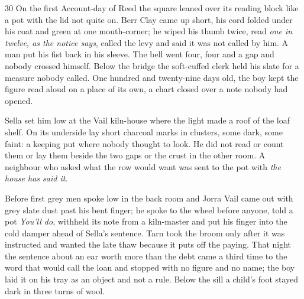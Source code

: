 
\scenebreak

\scenebreak


\scenebreak


\scenebreak

\CRtailpiece
\begin{CRchronicle}{30}
On the first Account-day of Reed the square leaned over its reading block like a pot with the lid not quite on. Berr Clay came up short, his cord folded under his coat and green at one mouth-corner; he wiped his thumb twice, read \emph{one in twelve, as the notice says}, called the levy and said it was not called by him. A man put his fist back in his sleeve. The bell went four, four and a gap and nobody crossed himself. Below the bridge the soft-cuffed clerk held his slate for a measure nobody called. One hundred and twenty-nine days old, the boy kept the figure read aloud on a place of its own, a chart closed over a note nobody had opened.

Sella set him low at the Vail kiln-house where the light made a roof of the loaf shelf. On its underside lay short charcoal marks in clusters, some dark, some faint: a keeping put where nobody thought to look. He did not read or count them or lay them beside the two gaps or the crust in the other room. A neighbour who asked what the row would want was sent to the pot with \emph{the house has said it}.

Before first grey men spoke low in the back room and Jorra Vail came out with grey slate dust past his bent finger; he spoke to the wheel before anyone, told a pot \emph{You’ll do}, withheld its note from a kiln-master and put his finger into the cold damper ahead of Sella’s sentence. Tarn took the broom only after it was instructed and wanted the late thaw because it puts off the paying. That night the sentence about an ear worth more than the debt came a third time to the word that would call the loan and stopped with no figure and no name; the boy laid it on his tray as an object and not a rule. Below the sill a child’s foot stayed dark in three turns of wool.


\end{CRchronicle}
